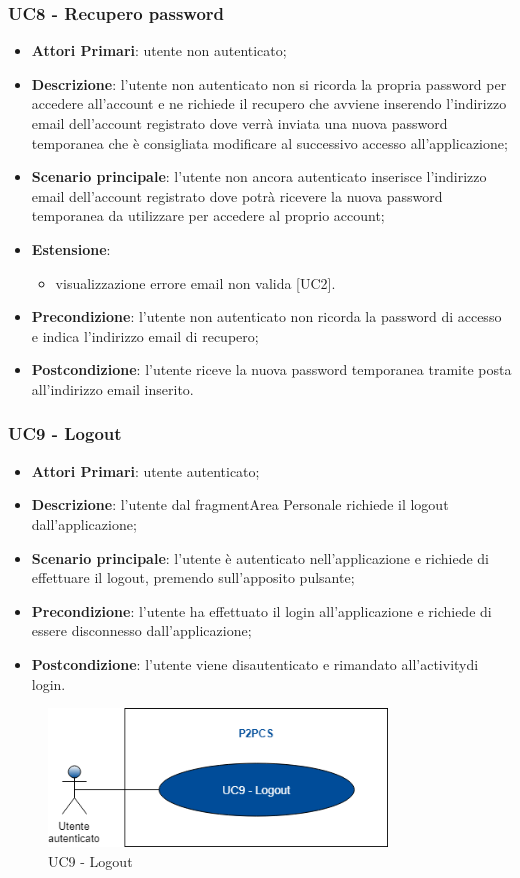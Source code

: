 \subsubsection{UC8 - Recupero password}
\begin{itemize}
	\item \textbf{Attori Primari}: utente non autenticato;
	\item \textbf{Descrizione}: l'utente non autenticato non si ricorda la propria password per accedere all'account e ne richiede il recupero che avviene inserendo l'indirizzo email dell'account registrato dove verrà inviata una nuova password temporanea che è consigliata modificare al successivo accesso all'applicazione;
	\item \textbf{Scenario principale}: l'utente non ancora autenticato inserisce l'indirizzo email dell'account registrato dove potrà ricevere la nuova password temporanea da utilizzare per accedere al proprio account;
	\item \textbf{Estensione}:
	\begin{itemize}
		\item visualizzazione errore email non valida [UC2].
	\end{itemize} 
	\item \textbf{Precondizione}: l'utente non autenticato non ricorda la password di accesso e indica l'indirizzo email di recupero;
	\item \textbf{Postcondizione}: l'utente riceve la nuova password temporanea tramite posta all'indirizzo email inserito.
\end{itemize}
\subsubsection{UC9 - Logout}
\begin{itemize}
	\item \textbf{Attori Primari}:
	utente autenticato;
	\item \textbf{Descrizione}: l'utente dal fragment\glosp Area Personale richiede il logout dall'applicazione;
	\item \textbf{Scenario principale}: l'utente è autenticato nell'applicazione e richiede di effettuare il logout, premendo sull'apposito pulsante;
	\item \textbf{Precondizione}: l'utente ha effettuato il login all'applicazione e richiede di essere disconnesso dall'applicazione;
	\item \textbf{Postcondizione}: l'utente viene disautenticato e rimandato all'activity\glosp di login. 
\end{itemize}
\begin{figure}[h]
	\includegraphics[width=9cm]{res/images/UC9Logout.png}
	\centering
	\caption{UC9 - Logout}
\end{figure}


